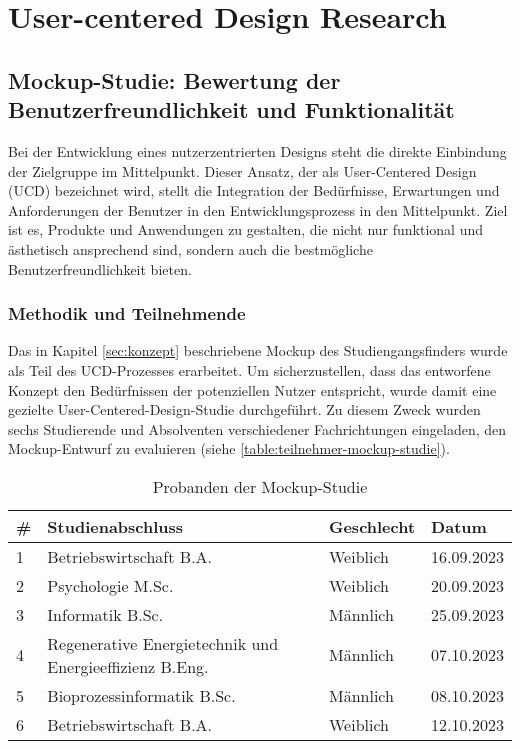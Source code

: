 \section{User-centered Design Research}

\subsection{Mockup-Studie: Bewertung der Benutzerfreundlichkeit und
Funktionalität}
Bei der Entwicklung eines nutzerzentrierten Designs steht die direkte Einbindung
der Zielgruppe im Mittelpunkt. Dieser Ansatz, der als User-Centered Design (UCD) 
bezeichnet wird, stellt die Integration der Bedürfnisse, Erwartungen und
Anforderungen der Benutzer in den Entwicklungsprozess in den Mittelpunkt. Ziel
ist es, Produkte und Anwendungen zu gestalten, die nicht nur funktional und
ästhetisch ansprechend sind, sondern auch die bestmögliche
Benutzerfreundlichkeit bieten.

\subsubsection{Methodik und Teilnehmende}
Das in Kapitel \ref{sec:konzept} beschriebene Mockup des Studiengangsfinders wurde als Teil des UCD-Prozesses erarbeitet. Um sicherzustellen, dass das entworfene Konzept den Bedürfnissen der potenziellen Nutzer entspricht, wurde damit eine gezielte User-Centered-Design-Studie durchgeführt. Zu diesem Zweck wurden sechs Studierende und Absolventen verschiedener Fachrichtungen eingeladen, den Mockup-Entwurf zu evaluieren (siehe \autoref{table:teilnehmer-mockup-studie}).

\begin{table}[!ht]
    \centering
    \begin{tabular}{|l|l|l|l|}
        \hline
        \textbf{\#} & \textbf{Studienabschluss}                               & \textbf{Geschlecht} & \textbf{Datum} \\ \hline
        1           & Betriebswirtschaft B.A.                                 & Weiblich            & 16.09.2023     \\ \hline
        2           & Psychologie M.Sc.                                       & Weiblich            & 20.09.2023     \\ \hline
        3           & Informatik B.Sc.                                        & Männlich            & 25.09.2023     \\ \hline
        4           & Regenerative Energietechnik und Energieeffizienz B.Eng. & Männlich            & 07.10.2023     \\ \hline
        5           & Bioprozessinformatik B.Sc.                              & Männlich            & 08.10.2023     \\ \hline
        6           & Betriebswirtschaft B.A.                                 & Weiblich            & 12.10.2023     \\ \hline
    \end{tabular}

    \caption{Probanden der Mockup-Studie}
    \label{table:teilnehmer-mockup-studie}
\end{table}

